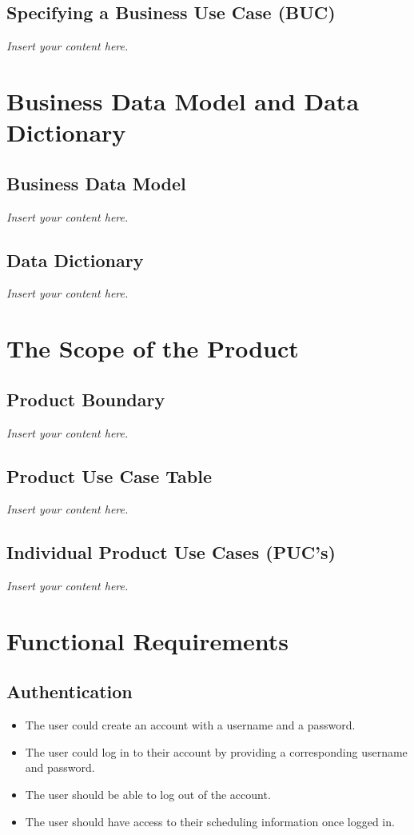 \documentclass[12pt]{article}
\newcommand{\lips}{\textit{Insert your content here.}}
\newcounter{reqnum} %
\newcommand{\rthereqnum}{FR\refstepcounter{reqnum}\thereqnum:}
\begin{document}
\subsection{Specifying a Business Use Case (BUC)}
\lips

\section{Business Data Model and Data Dictionary}
\subsection{Business Data Model}
\lips
\subsection{Data Dictionary}
\lips

\section{The Scope of the Product}
\subsection{Product Boundary}
\lips
\subsection{Product Use Case Table}
\lips
\subsection{Individual Product Use Cases (PUC's)}
\lips

\section{Functional Requirements}
\subsection{Authentication}
\begin{itemize}

\item[\rthereqnum]
The user could create an account with a username and a password.
\item[\rthereqnum]
The user could log in to their account by providing a corresponding username and password.
\item[\rthereqnum]
The user should be able to log out of the account.
\item[\rthereqnum]
The user should have access to their scheduling information once logged in.

\end{itemize}
\end{document}
